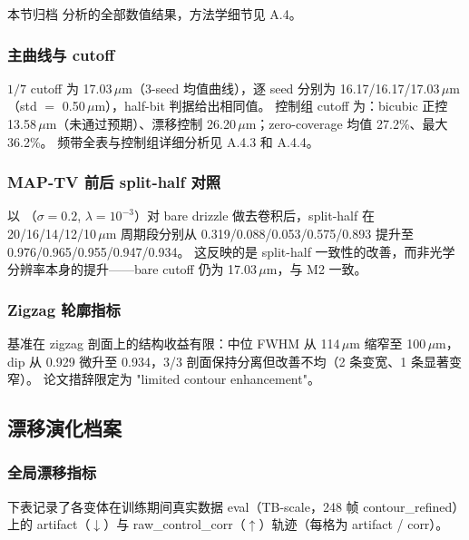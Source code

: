 本节归档  分析的全部数值结果，方法学细节见 A.4。

\subsubsection{主曲线与 cutoff}

\(1/7\) cutoff 为 17.03\,\(\mu\)m（3-seed 均值曲线），逐 seed 分别为 16.17/16.17/17.03\,\(\mu\)m（std \(=\) 0.50\,\(\mu\)m），half-bit 判据给出相同值。
控制组 cutoff 为：bicubic 正控 13.58\,\(\mu\)m（未通过预期）、漂移控制 26.20\,\(\mu\)m；zero-coverage 均值 27.2\%、最大 36.2\%。
频带全表与控制组详细分析见 A.4.3 和 A.4.4。

\subsubsection{MAP-TV 前后 split-half 对照}

以 （\(\sigma = 0.2\), \(\lambda = 10^{-3}\)）对 bare drizzle 做去卷积后，split-half  在 20/16/14/12/10\,\(\mu\)m 周期段分别从 0.319/0.088/0.053/0.575/0.893 提升至 0.976/0.965/0.955/0.947/0.934。
这反映的是 split-half 一致性的改善，而非光学分辨率本身的提升——bare cutoff 仍为 17.03\,\(\mu\)m，与 M2 一致。

\subsubsection{Zigzag 轮廓指标}

 基准在 zigzag 剖面上的结构收益有限：中位 FWHM 从 114\,\(\mu\)m 缩窄至 100\,\(\mu\)m，dip 从 0.929 微升至 0.934，3/3 剖面保持分离但改善不均（2 条变宽、1 条显著变窄）。
论文措辞限定为 "limited contour enhancement"。

\subsection{漂移演化档案}

\subsubsection{全局漂移指标}

下表记录了各变体在训练期间真实数据 eval（TB-scale，248 帧 contour\_refined）上的 artifact（\(\downarrow\)）与 raw\_control\_corr（\(\uparrow\)）轨迹（每格为 artifact / corr）。

